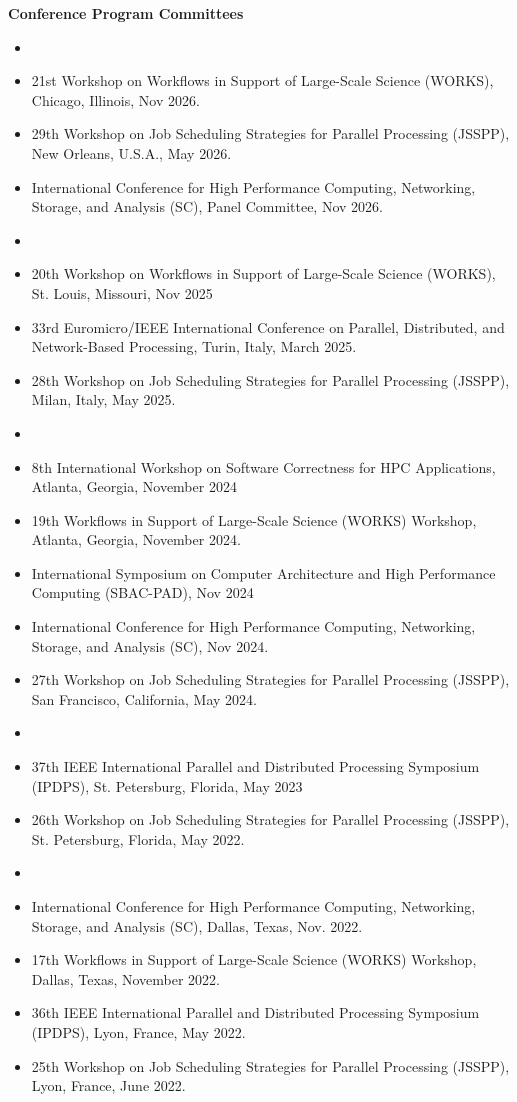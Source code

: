 \documentclass[times,11pt]{letter}
\begin{document}
\noindent
{\bf Conference Program Committees}
\begin{itemize}
\item [2026]
\item [--] 21st Workshop on Workflows in Support of Large-Scale Science (WORKS), Chicago, Illinois, Nov 2026.
\item [--] 29th Workshop on Job Scheduling Strategies for Parallel Processing (JSSPP), New Orleans, U.S.A., May 2026.
\item [--] International Conference for High Performance Computing, Networking, Storage, and Analysis (SC), Panel Committee, Nov 2026.

\item [2025]
\item [--] 20th Workshop on Workflows in Support of Large-Scale Science (WORKS), St. Louis, Missouri, Nov 2025
\item [--] 33rd Euromicro/IEEE International Conference on Parallel, Distributed, and Network-Based Processing, Turin, Italy, March 2025.
\item [--] 28th Workshop on Job Scheduling Strategies for Parallel Processing (JSSPP), Milan, Italy, May 2025.

\item [2024]
\item [--] 8th International Workshop on Software Correctness for HPC Applications, Atlanta, Georgia, November 2024
\item [--] 19th Workflows in Support of Large-Scale Science (WORKS) Workshop, Atlanta, Georgia,  November 2024.
\item [--] International Symposium on Computer Architecture and High Performance Computing (SBAC-PAD), Nov 2024
\item [--] International Conference for High Performance Computing, Networking, Storage, and Analysis (SC), Nov 2024.
\item [--] 27th Workshop on Job Scheduling Strategies for Parallel Processing (JSSPP), San Francisco, California, May 2024.

\item [2023]
\item [--] 37th IEEE International Parallel and Distributed Processing Symposium (IPDPS), St. Petersburg, Florida, May 2023
\item [--] 26th Workshop on Job Scheduling Strategies for Parallel Processing (JSSPP), St. Petersburg, Florida, May 2022.

\item [2022]
\item [--] International Conference for High Performance Computing, Networking, Storage, and Analysis (SC), Dallas, Texas, Nov. 2022.
\item [--] 17th Workflows in Support of Large-Scale Science (WORKS) Workshop, Dallas, Texas,  November 2022.
\item [--] 36th IEEE International Parallel and Distributed Processing Symposium (IPDPS), Lyon, France, May 2022.
\item [--] 25th Workshop on Job Scheduling Strategies for Parallel Processing (JSSPP), Lyon, France, June 2022.


\end{itemize}
\end{document}

